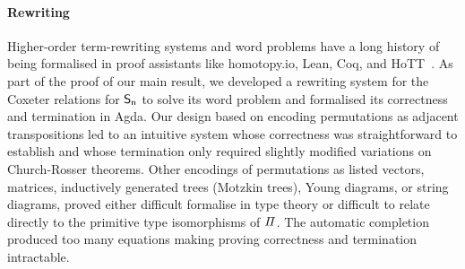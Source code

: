 \paragraph{Rewriting} Higher-order term-rewriting systems and word problems have a long history of being formalised in
proof assistants like {homotopy.io}, Lean, Coq, and HoTT~\cite{krausCoherenceWellFoundednessTaming2020}. As part of the
proof of our main result, we developed a rewriting system for the Coxeter relations for $\Sn$ to solve its word problem
and formalised its correctness and termination in Agda. Our design based on encoding permutations as
adjacent transpositions led to an intuitive system whose correctness was straightforward to establish and whose termination
only required slightly modified variations on Church-Rosser theorems. Other encodings of permutations as listed vectors,
matrices, inductively generated trees (Motzkin trees), Young diagrams, or string diagrams, proved either difficult
formalise in type theory or difficult to relate directly to the primitive type isomorphisms of $\mathit{\Pi}$. The automatic
\citet{knuthSimpleWordProblems1970} completion produced too many equations making proving correctness and termination
intractable.

